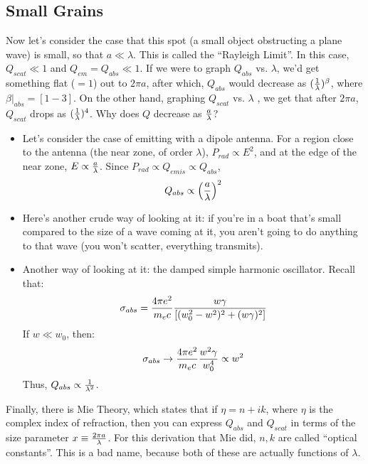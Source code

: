 \documentclass[11pt]{article}
\def\inv#1{{1 \over #1}}
\def\eval#1{\big|_{#1}}
\begin{document}
\subsection*{ Small Grains}

Now let's consider the case that this spot (a small object obstructing a 
plane wave) is small, so that $a \ll \lambda$.  This is called the ``Rayleigh
Limit''.  In this case, $Q_{scat} \ll 1$ and $Q_{em} = Q_{abs} \ll 1$.  If
\def\qabs{Q_{abs}}
\def\qscat{Q_{scat}}
\def\qemis{Q_{emis}}
we were to graph $\qabs$ vs. $\lambda$, we'd get something flat ($= 1$) out to
$2\pi a$, after which, $\qabs$ would decrease as $(\inv{\lambda})^\beta$, where
$\beta\eval{abs} = [1-3]$.  On the other hand, graphing $\qscat$ vs. $\lambda$
, we get that after $2\pi a$, $\qscat$ drops as $(\inv{\lambda})^4$. 
Why does $Q$ decrease as $a\over \lambda$?\par

\begin{itemize}
\item  Let's consider the case of emitting with a dipole antenna.  For a 
region close to the antenna (the near zone, of order $\lambda$), 
$P_{rad}\propto E^2$, and at the edge of the near zone, 
$E\propto{a\over\lambda}$.  Since $P_{rad}\propto\qemis\propto\qabs$,
$$\qabs\propto\left({a\over\lambda}\right)^2$$

\item  Here's another crude way of looking at it: 
if you're in a boat that's small compared
to the size of a wave coming at it, you aren't going to do anything to that
wave (you won't scatter, everything transmits).

\item  Another way of looking at it: 
the damped simple harmonic oscillator.  Recall that:
$$\sigma_{abs} = {4\pi e^2\over m_e c}{w\gamma \over \left[(w_0^2-w^2)^2 +
(w\gamma)^2\right]}$$
If $w \ll w_0$, then:
$$\sigma_{abs} \to {4\pi e^2\over m_e c}{w^2\gamma \over w_0^4} \propto w^2$$
Thus, $\qabs \propto \inv{\lambda^2}$.
\end{itemize}

Finally, there is Mie Theory, which states that if $\eta = n +ik$, where
$\eta$ is the complex index of refraction, then you can express $\qabs$ and
$\qscat$ in terms of the size parameter $x \equiv {2\pi a\over \lambda}$.
For this derivation that Mie did, $n, k$ are called ``optical constants''.  This
is a bad name, because both of these are actually functions of $\lambda$.\par
\end{document}
